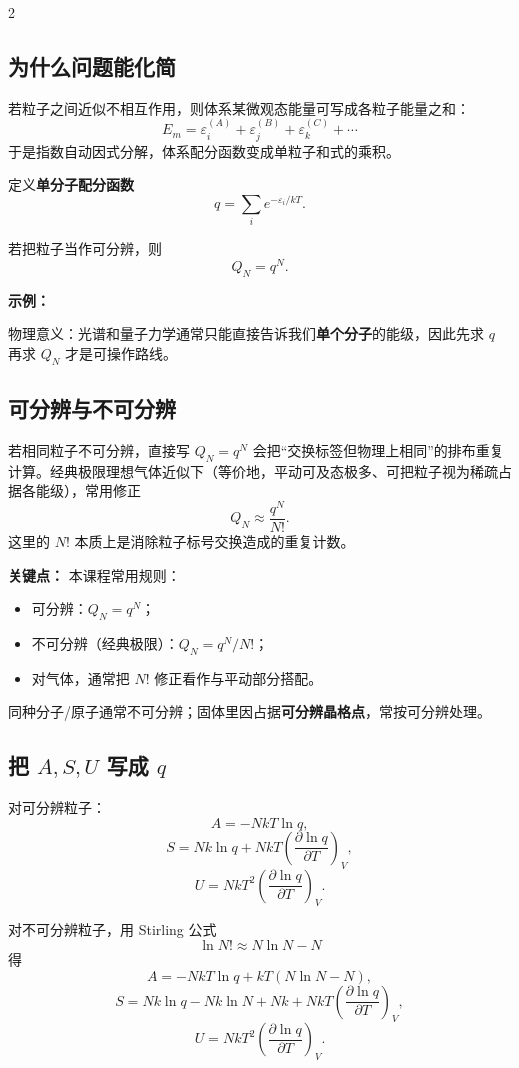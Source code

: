\documentclass[a4paper,9pt]{article}
\newenvironment{keypoint}
{\par\vspace{0.3em}\noindent\begin{tcolorbox}[
  colback=keybg,
  colframe=keycolor,
  boxrule=0.5pt,
  arc=2pt,
  left=2pt,
  right=2pt,
  top=2pt,
  bottom=2pt,
  boxsep=0pt,
  ]
\noindent\textcolor{keycolor}{\textbf{关键点：}}}
{\end{tcolorbox}\par\vspace{0.3em}}
\newenvironment{examplebox}
{\par\vspace{0.3em}\noindent\begin{tcolorbox}[
  colback=boxbg,
  colframe=derivcolor,
  boxrule=0.5pt,
  arc=2pt,
  left=2pt,
  right=2pt,
  top=2pt,
  bottom=2pt,
  boxsep=0pt,
  ]
\scriptsize\noindent\textcolor{derivcolor}{\textbf{示例：}}\par
\setlength{\parskip}{0.1ex}\setlength{\itemsep}{0pt}\setlength{\parsep}{0pt}}
{\end{tcolorbox}\par\vspace{0.3em}}
\begin{document}
\begin{multicols}{2}
	\subsection{为什么问题能化简}
	若粒子之间近似不相互作用，则体系某微观态能量可写成各粒子能量之和：
	\[
		E_m=\varepsilon_i^{(A)}+\varepsilon_j^{(B)}+\varepsilon_k^{(C)}+\cdots
	\]
	于是指数自动因式分解，体系配分函数变成单粒子和式的乘积。

	定义\textbf{单分子配分函数}
	\[
		q=\sum_i e^{-\varepsilon_i/kT}.
	\]

	若把粒子当作可分辨，则
	\[
		Q_N=q^N.
	\]

	\begin{examplebox}
		物理意义：光谱和量子力学通常只能直接告诉我们\textbf{单个分子}的能级，因此先求 $q$ 再求 $Q_N$ 才是可操作路线。
	\end{examplebox}

	\subsection{可分辨与不可分辨}
	若相同粒子不可分辨，直接写 $Q_N=q^N$ 会把“交换标签但物理上相同”的排布重复计算。经典极限理想气体近似下（等价地，平动可及态极多、可把粒子视为稀疏占据各能级），常用修正
	\[
		Q_N\approx \frac{q^N}{N!}.
	\]
	这里的 $N!$ 本质上是消除粒子标号交换造成的重复计数。

	\begin{keypoint}
		本课程常用规则：
		\begin{itemize}
			\item 可分辨：$Q_N=q^N$；
			\item 不可分辨（经典极限）：$Q_N=q^N/N!$；
			\item 对气体，通常把 $N!$ 修正看作与平动部分搭配。
		\end{itemize}
		同种分子/原子通常不可分辨；固体里因占据\textbf{可分辨晶格点}，常按可分辨处理。
	\end{keypoint}

	\subsection{把 $A,S,U$ 写成 $q$}
	对可分辨粒子：
	\[
		A=-NkT\ln q,
	\]
	\[
		S=Nk\ln q+NkT\left(\frac{\partial\ln q}{\partial T}\right)_V,
	\]
	\[
		U=NkT^2\left(\frac{\partial\ln q}{\partial T}\right)_V.
	\]

	对不可分辨粒子，用 Stirling 公式
	\[
		\ln N!\approx N\ln N-N
	\]
	得
	\[
		A=-NkT\ln q+kT(N\ln N-N),
	\]
	\[
		S=Nk\ln q-Nk\ln N+Nk+NkT\left(\frac{\partial\ln q}{\partial T}\right)_V,
	\]
	\[
		U=NkT^2\left(\frac{\partial\ln q}{\partial T}\right)_V.
	\]


\end{multicols}
\end{document}
